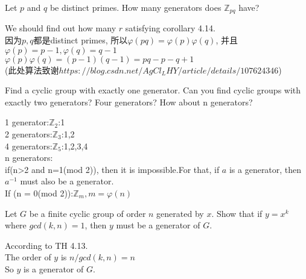 \documentclass[a4paper, justified]{tufte-handout}
\begin{document}
\begin{problem}[TJ 4-24]
Let $p$ and $q$ be distinct primes. How many generators does $\mathbb{Z}_{pq}$ have?
\end{problem}

\begin{solution}
	We should find out how many $r$ satisfying corollary 4.14.\\
	因为$p,q$都是distinct primes, 所以$\varphi(pq) = \varphi(p)\varphi(q)$, 并且$\varphi(p) =p-1,\varphi(q) =q-1$\\
	$\varphi (p) \varphi(q)=(p-1)(q-1)=pq-p-q+1$\\
	(此处算法致谢$https://blog.csdn.net/AgCl_LHY/article/details/107624346$)
\end{solution}




\begin{problem}[TJ 4-12]
Find a cyclic group with exactly one generator. Can you find cyclic groups with exactly two generators? Four generators? How about n generators?
\end{problem}

\begin{solution}
	1 generator:$\mathbb{Z}_2$:1\\
	2 generators:$\mathbb{Z}_3$:1,2\\
	4 generators:$\mathbb{Z}_5$:1,2,3,4\\
	n generators:\\
	if(n>2 and n=1(mod 2)), then it is impossible.For that, if $a$ is a generator, then $a^{-1}$ must also be a generator.\\
	If (n = 0(mod 2)):$\mathbb{Z}_m,m=\varphi(n)$
\end{solution}

\begin{problem}[TJ 4-32]
Let $G$ be a finite cyclic group of order $n$ generated by $x$. Show that if $y = x^k$ where $gcd(k, n) = 1$, then $y$ must be a generator of $G$.
\end{problem}

\begin{solution}
	According to TH 4.13.\\
	The order of $y$ is $n/gcd(k, n)=n$\\
	So $y$ is a generator of $G$.
\end{solution}
\end{document}
